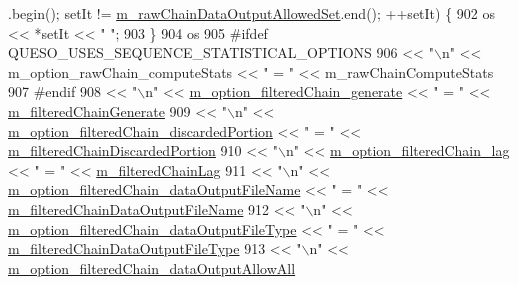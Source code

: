 \begin{DoxyCode}
      .begin(); setIt != \hyperlink{class_q_u_e_s_o_1_1_m_l_sampling_level_options_ae5c2fe5b90eda78e17ccfbf3dbcfcc89}{m\_rawChainDataOutputAllowedSet}.end(); ++setIt) \{
902     os << *setIt << \textcolor{stringliteral}{" "};
903   \}
904   os
905 \textcolor{preprocessor}{#ifdef QUESO\_USES\_SEQUENCE\_STATISTICAL\_OPTIONS}
906 \textcolor{preprocessor}{}     << \textcolor{stringliteral}{"\(\backslash\)n"} << m\_option\_rawChain\_computeStats                      << \textcolor{stringliteral}{" = "} << m\_rawChainComputeStats
907 \textcolor{preprocessor}{#endif}
908 \textcolor{preprocessor}{}     << \textcolor{stringliteral}{"\(\backslash\)n"} << \hyperlink{class_q_u_e_s_o_1_1_m_l_sampling_level_options_a889952cbad52c41c179ff6ffecf82dd7}{m\_option\_filteredChain\_generate}                     << \textcolor{stringliteral}{" = "}
       << \hyperlink{class_q_u_e_s_o_1_1_m_l_sampling_level_options_a878542ef3504c843b50e0bd5efd0c078}{m\_filteredChainGenerate}
909      << \textcolor{stringliteral}{"\(\backslash\)n"} << \hyperlink{class_q_u_e_s_o_1_1_m_l_sampling_level_options_aa1d2bc1ba487c867b5ab68748f1e6c55}{m\_option\_filteredChain\_discardedPortion}             
      << \textcolor{stringliteral}{" = "} << \hyperlink{class_q_u_e_s_o_1_1_m_l_sampling_level_options_a22220cb7fbdef58a009733f8cf1887f9}{m\_filteredChainDiscardedPortion}
910      << \textcolor{stringliteral}{"\(\backslash\)n"} << \hyperlink{class_q_u_e_s_o_1_1_m_l_sampling_level_options_a52e58ef7b6d840b8c6f7d505ba9cf1b2}{m\_option\_filteredChain\_lag}                          << \textcolor{stringliteral}{" = "} << 
      \hyperlink{class_q_u_e_s_o_1_1_m_l_sampling_level_options_a6740efa52d4f8ec112be817f5220cf94}{m\_filteredChainLag}
911      << \textcolor{stringliteral}{"\(\backslash\)n"} << \hyperlink{class_q_u_e_s_o_1_1_m_l_sampling_level_options_af9ec9aa644d0ee22a42a2aa7fdf49218}{m\_option\_filteredChain\_dataOutputFileName}         
        << \textcolor{stringliteral}{" = "} << \hyperlink{class_q_u_e_s_o_1_1_m_l_sampling_level_options_abf333c405ee097104ee9b1b1e92ecd97}{m\_filteredChainDataOutputFileName}
912      << \textcolor{stringliteral}{"\(\backslash\)n"} << \hyperlink{class_q_u_e_s_o_1_1_m_l_sampling_level_options_a39e79ec1b87802ecd32bf4999908ecbf}{m\_option\_filteredChain\_dataOutputFileType}         
        << \textcolor{stringliteral}{" = "} << \hyperlink{class_q_u_e_s_o_1_1_m_l_sampling_level_options_a154ba7fd5c2fbc98af0ac91bb022a232}{m\_filteredChainDataOutputFileType}
913      << \textcolor{stringliteral}{"\(\backslash\)n"} << \hyperlink{class_q_u_e_s_o_1_1_m_l_sampling_level_options_a87338f130d6059b62643ad609f26bfb6}{m\_option\_filteredChain\_dataOutputAllowAll}         

\end{DoxyCode}
